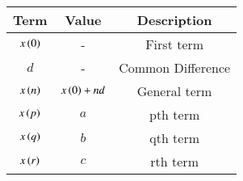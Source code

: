 \begin{tabular}{|c|c|c|}
    \hline
    \textbf{Term} & \textbf{Value} & \textbf{Description}\\
    \hline
    $x\left(0\right)$ & - & First term\\
    \hline
    $d$ & - & Common Difference\\
    \hline
    $x\left(n\right)$ & $x\left(0\right)+nd$ & General term\\
    \hline
    $x\left(p\right)$ & $a$ & pth term\\
    \hline
    $x\left(q\right)$ & $b$ & qth term\\
    \hline
    $x\left(r\right)$ & $c$ & rth term\\
    \hline
  \end{tabular}
  
